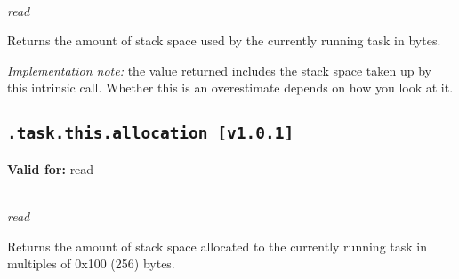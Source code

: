 \documentclass{article}
\begin{document}
~\\
\textit{read}

Returns the amount of stack space used by the currently running task in bytes.

\textit{Implementation note:} the value returned includes the stack space taken up by this intrinsic call.
Whether this is an overestimate depends on how you look at it.

\subsection{\texttt{.task.this.allocation [v1.0.1]}}
\textbf{Valid for:} read

~\\
\textit{read}

Returns the amount of stack space allocated to the currently running task in multiples of 0x100 (256) bytes.
\end{document}
